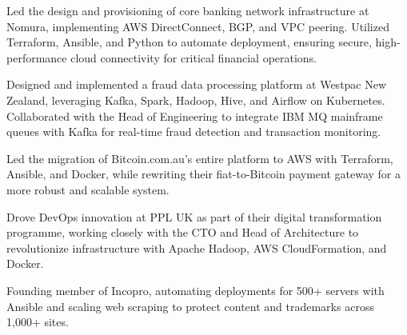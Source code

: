 \documentclass[]{resume}
\begin{document}
\begin{minipage}[t]{0.60\textwidth}
\begin{tightemize}
\item Led the design and provisioning of core banking network infrastructure at Nomura, implementing AWS DirectConnect, BGP, and VPC peering. Utilized Terraform, Ansible, and Python to automate deployment, ensuring secure, high-performance cloud connectivity for critical financial operations.
\end{tightemize}
\sectionsep

\begin{tightemize}
\item Designed and implemented a fraud data processing platform at Westpac New Zealand, leveraging Kafka, Spark, Hadoop, Hive, and Airflow on Kubernetes. Collaborated with the Head of Engineering to integrate IBM MQ mainframe queues with Kafka for real-time fraud detection and transaction monitoring.
\end{tightemize}
\sectionsep

\begin{tightemize}
\item Led the migration of Bitcoin.com.au’s entire platform to AWS with Terraform, Ansible, and Docker, while rewriting their fiat-to-Bitcoin payment gateway for a more robust and scalable system.
\end{tightemize}
\sectionsep

\begin{tightemize}
\item Drove DevOps innovation at PPL UK as part of their digital transformation programme, working closely with the CTO and Head of Architecture to revolutionize infrastructure with Apache Hadoop, AWS CloudFormation, and Docker.
\end{tightemize}
\sectionsep

\begin{tightemize}
\item Founding member of Incopro, automating deployments for 500+ servers with Ansible and scaling web scraping to protect content and trademarks across 1,000+ sites.
\end{tightemize}
\sectionsep


\end{minipage}
\end{document}
